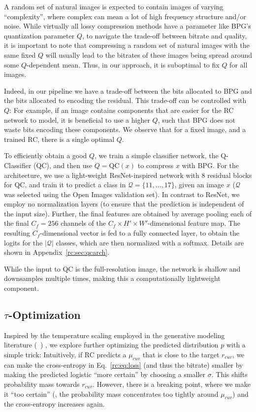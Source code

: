 A random set of natural images is expected to contain images of varying ``complexity'', where complex can mean a lot of high frequency structure and/or noise. 
While virtually all lossy compression methods have a parameter like BPG's quantization parameter $Q$, to navigate the trade-off between bitrate and quality, it is important to note that compressing a random set of natural images with the same fixed $Q$ will usually lead to the bitrates of these images being spread around some $Q$-dependent mean. Thus, in our approach, it is suboptimal to fix $Q$ for all images.

Indeed, in our pipeline we have a trade-off between the bits allocated to BPG and the bits allocated to encoding the residual. This trade-off can be controlled with $Q$: For example, if an image contains components that are easier for the RC network to model, it is beneficial to use a higher $Q$, such that BPG does not waste bits encoding these components. We observe that for a fixed image, and a trained RC, there is a single optimal $Q$.

To efficiently obtain a good $Q$, we train a simple classifier network, the Q-Classifier (QC), and then use
$Q = \text{QC}(x)$
to compress $x$ with BPG.
For the architecture, we use a light-weight ResNet-inspired network with 8 residual blocks for QC, and train it to predict a class in $\mathcal{Q} = \{11, \dots, 17\}$, given an image $x$ ($\mathcal{Q}$ was selected using the Open Images validation set).  In contrast to ResNet, we employ no normalization layers (to ensure that the prediction is independent of the input size). Further, the final features are obtained by average pooling each of the final $C_f=256$ channels of the $C_f{\times}H'{\times}W'$-dimensional feature map. The resulting $C_f$-dimensional vector is fed to a fully connected layer, to obtain the logits for the $|\mathcal{Q}|$ classes, which are then normalized with a softmax.
Details are shown in Appendix~\ref{rc:sec:qcarch}.

While the input to QC is the full-resolution image, the network is shallow and downsamples multiple times, making this a computationally lightweight component. 

\subsection{$\tau$-Optimization}\label{rc:sec:tauotpim}


Inspired by the temperature scaling employed in the generative modeling literature (\eg~\cite{kingma2018glow})
, we explore further optimizing the predicted distribution $p$ with a simple trick: Intuitively, if RC predicts a $\mu_{cuv}$ that is close to the target $r_{cuv}$, we can make the cross-entropy in Eq.~\ref{rc:eq:loss} (and thus the bitrate) smaller by making the predicted logistic ``more certain'' by choosing a smaller $\sigma$. This shifts probability mass towards $r_{cuv}$. However, there is a breaking point, where we make it ``too certain'' (\ie, the probability mass concentrates too tightly around $\mu_{cuv}$) and the cross-entropy increases again.

